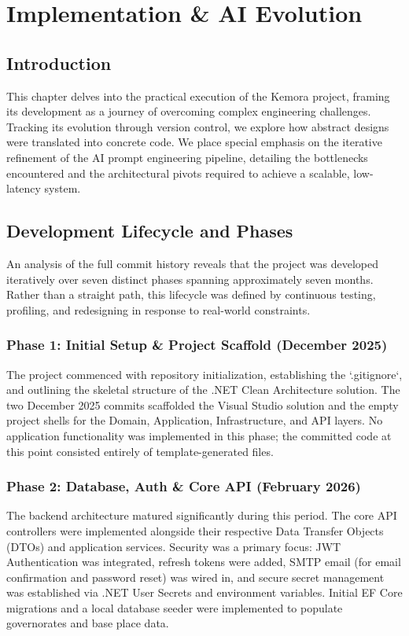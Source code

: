 \chapter{Implementation \& AI Evolution}

\section{Introduction}
This chapter delves into the practical execution of the Kemora project, framing its development as a journey of overcoming complex engineering challenges. Tracking its evolution through version control, we explore how abstract designs were translated into concrete code. We place special emphasis on the iterative refinement of the AI prompt engineering pipeline, detailing the bottlenecks encountered and the architectural pivots required to achieve a scalable, low-latency system.

\section{Development Lifecycle and Phases}
An analysis of the full commit history reveals that the project was developed iteratively over seven distinct phases spanning approximately seven months. Rather than a straight path, this lifecycle was defined by continuous testing, profiling, and redesigning in response to real-world constraints.

\subsection{Phase 1: Initial Setup \& Project Scaffold (December 2025)}
The project commenced with repository initialization, establishing the `.gitignore`, and outlining the skeletal structure of the .NET Clean Architecture \cite{clean_architecture} solution. The two December 2025 commits scaffolded the Visual Studio solution and the empty project shells for the Domain, Application, Infrastructure, and API layers. No application functionality was implemented in this phase; the committed code at this point consisted entirely of template-generated files.

\subsection{Phase 2: Database, Auth \& Core API (February 2026)}
The backend architecture matured significantly during this period. The core API controllers were implemented alongside their respective Data Transfer Objects (DTOs) and application services. Security was a primary focus: JWT Authentication was integrated, refresh tokens were added, SMTP email (for email confirmation and password reset) was wired in, and secure secret management was established via .NET User Secrets and environment variables. Initial EF Core migrations and a local database seeder were implemented to populate governorates and base place data.

